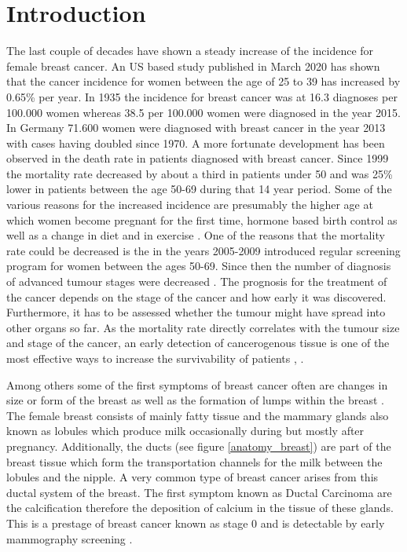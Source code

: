 \chapter{Introduction}
\label{chap:introduction}


The last couple of decades have shown a steady increase of the incidence for female breast cancer.
An US based study published in March 2020 \cite{Lima2020Trends2015} has shown that the cancer incidence for women between the age of 25 to 39 has increased by 0.65\% per year. In 1935 the incidence for breast cancer was at 16.3 diagnoses per 100.000 women whereas 38.5 per 100.000 women were diagnosed in the year 2015.
In Germany 71.600 women were diagnosed with breast cancer in the year 2013 with cases having doubled since 1970. A more fortunate development has been observed in the death rate in patients diagnosed with breast cancer. Since 1999 the mortality rate decreased by about a third in patients under 50 and was 25\% lower in patients between the age 50-69 during that 14 year period.
Some of the various reasons for the increased incidence are presumably the higher age at which women become pregnant for the first time, hormone based birth control as well as a change in diet and in exercise \cite{RobertKoch-Institut2016Bericht2016}.
One of the reasons that the mortality rate could be decreased is the in the years 2005-2009 introduced  regular screening program for women between the ages 50-69. Since then the number of diagnosis of advanced tumour stages were decreased \cite{RobertKoch-Institut2016Bericht2016}.
The prognosis for the treatment of the cancer depends on the stage of the cancer and how early it was discovered. Furthermore, it has to be assessed whether the tumour might have spread into other organs so far. As the mortality rate directly correlates with the tumour size and stage of the cancer, an early detection of cancerogenous tissue is one of the most effective ways to increase the survivability of patients \cite{Veronesi1985PrognosisNodes}, \cite{Welch2016Breast-CancerEffectiveness}.

Among others some of the first symptoms of breast cancer often are changes in size or form of the breast as well as the formation of lumps within the breast  \cite{NationalInstitutesofHealthNIH-NationalCancerInstituteNCIBreastTreatment}.
The female breast consists of mainly fatty tissue and the mammary glands also known as lobules which produce milk occasionally during but mostly after pregnancy. Additionally, the ducts (see figure \ref{anatomy_breast}) are part of the breast tissue which form the transportation channels for the milk between the lobules and the nipple.
A very common type of breast cancer arises from this ductal system of the breast. The first symptom known as Ductal Carcinoma are the calcification therefore the deposition of calcium in the tissue of these glands.
This is a prestage of breast cancer known as stage 0 and is detectable by early mammography screening \cite{brestcancer_stages}.  


